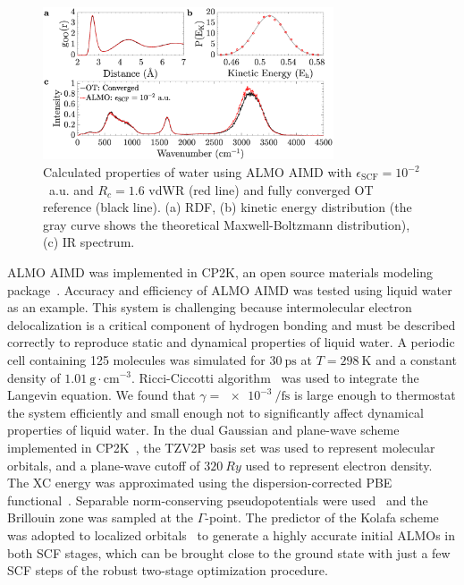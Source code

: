 \documentclass[aps,prl,reprint,amsmath,amssymb]{revtex4-1}
\begin{document}
\begin{figure}
\includegraphics[trim={1.3cm 0.1cm 3.3cm 1.3cm},clip,width=8.6cm]{Dynamical_Data_Tiled.eps}
\caption{\label{fig:dynproperties} 
Calculated properties of water using ALMO AIMD with $\epsilon_{\text{SCF}} = 10^{-2}$~a.u. and $R_{c} = 1.6$ vdWR (red line) and fully converged OT reference (black line).
(a) RDF, 
(b) kinetic energy distribution (the gray curve shows the theoretical Maxwell-Boltzmann distribution), 
(c) IR spectrum.
}
\end{figure}

ALMO AIMD was implemented in CP2K, an open source materials modeling package~\cite{www:cp2k}. 
Accuracy and efficiency of ALMO AIMD was tested using liquid water as an example. 
This system is challenging because intermolecular electron delocalization is a critical component of hydrogen bonding and must be described correctly to reproduce static and dynamical properties of liquid water. 
A periodic cell containing 125 molecules was simulated for $\SI{30}{\ps}$ at $T=\SI{298}{\K}$ and a constant density of $\SI{1.01}{\g\cdot\cm^{-3}}$. 
Ricci-Ciccotti algorithm~\cite{Ricci2003} was used to integrate the Langevin equation. We found that $\gamma = \SI{e-3}{\per\fs}$ is large enough to thermostat the system efficiently and small enough not to significantly affect dynamical properties of liquid water.
%
In the dual Gaussian and plane-wave scheme implemented in CP2K~\cite{a:quickstep}, the TZV2P basis set was used to represent molecular orbitals, and a plane-wave cutoff of $\SI{320}{Ry}$ used to represent electron density. 
The XC energy was approximated using the dispersion-corrected PBE functional~\cite{a:pbe,Grimme2010}. 
Separable norm-conserving pseudopotentials were used~\cite{a:hgh} and the Brillouin zone was sampled at the $\Gamma$-point. 
%
The predictor of the Kolafa scheme~\cite{Kolafa2003} was adopted to localized orbitals~\cite{a:2ndcpmd} to generate a highly accurate initial ALMOs in both SCF stages, which can be brought close to the ground state with just a few SCF steps of the robust two-stage optimization procedure. 
\end{document}
